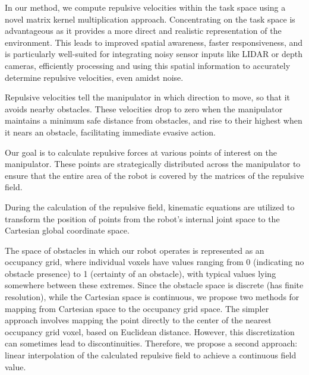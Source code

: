 \documentclass[]{article}
\begin{document}
% 
% 

In our method, we compute repulsive velocities within the task space using a novel matrix kernel multiplication approach. Concentrating on the task space is advantageous as it provides a more direct and realistic representation of the environment. This leads to improved spatial awareness, faster responsiveness, and is particularly well-suited for integrating noisy sensor inputs like LIDAR or depth cameras, efficiently processing and using this spatial information to accurately determine repulsive velocities, even amidst noise.

Repulsive velocities tell the manipulator in which direction to move, so that it avoids nearby obstacles. These velocities drop to zero when the manipulator maintains a minimum safe distance from obstacles, and rise to their highest when it nears an obstacle, facilitating immediate evasive action. 

Our goal is to calculate repulsive forces at various points of interest on the manipulator. These points are strategically distributed across the manipulator to ensure that the entire area of the robot is covered by the matrices of the repulsive field.

During the calculation of the repulsive field, kinematic equations are utilized to transform the position of points from the robot's internal joint space to the Cartesian global coordinate space.

The space of obstacles in which our robot operates is represented as an occupancy grid, where individual voxels have values ranging from 0 (indicating no obstacle presence) to 1 (certainty of an obstacle), with typical values lying somewhere between these extremes. Since the obstacle space is discrete (has finite resolution), while the Cartesian space is continuous, we propose two methods for mapping from Cartesian space to the occupancy grid space. The simpler approach involves mapping the point directly to the center of the nearest occupancy grid voxel, based on Euclidean distance. However, this discretization can sometimes lead to discontinuities. Therefore, we propose a second approach: linear interpolation of the calculated repulsive field to achieve a continuous field value.
\end{document}
